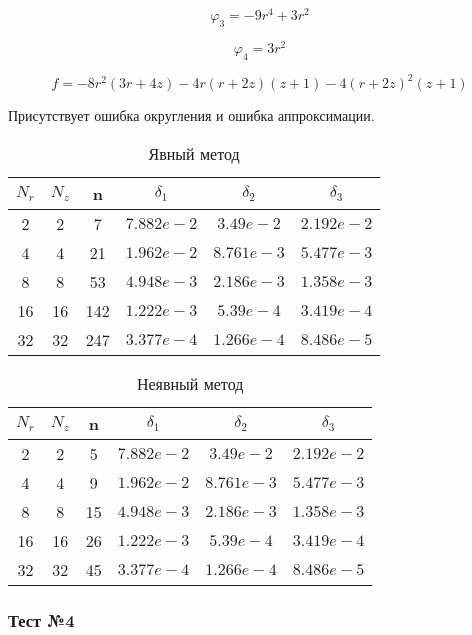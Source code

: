 \[
 \varphi_3 = -9r^4 + 3r^2
\]

\[
 \varphi_4 = 3r^2
\]

\[
  f = - 8 r^{2}\left(3 r + 4 z\right) - 4 r \left(r + 2 z\right) \left(z + 1\right) - 4 \left(r + 2 z\right)^{2} \left(z + 1\right)
\]

Присутствует ошибка округления и ошибка аппроксимации.

\begin{table}[H]
  \begin{center}
    \begin{tabular}{*{6}c}
      \toprule
      $ N_r $ & $ N_z $ & n & $ \delta_1 $ & $ \delta_2 $ & $ \delta_3 $ \\
      \midrule
      2 & 2 & 7 & $7.882e-2 $ & $3.49e-2 $ & $2.192e-2 $ \\
      4 & 4 & 21 & $1.962e-2 $ & $8.761e-3 $ & $5.477e-3 $ \\
      8 & 8 & 53 & $4.948e-3 $ & $2.186e-3 $ & $1.358e-3 $ \\
      16 & 16 & 142 & $1.222e-3 $ & $5.39e-4 $ & $3.419e-4 $ \\
      32 & 32 & 247 & $3.377e-4 $ & $1.266e-4 $ & $8.486e-5 $ \\
      \bottomrule
    \end{tabular}
    \caption{Явный метод}
  \end{center}
\end{table}
  
\begin{table}[H]
  \begin{center}
    \begin{tabular}{*{6}c}
      \toprule
      $ N_r $ & $ N_z $ & n & $ \delta_1 $ & $ \delta_2 $ & $ \delta_3 $ \\
      \midrule
      2 & 2 & 5 & $7.882e-2 $ & $3.49e-2 $ & $2.192e-2 $ \\
      4 & 4 & 9 & $1.962e-2 $ & $8.761e-3 $ & $5.477e-3 $ \\
      8 & 8 & 15 & $4.948e-3 $ & $2.186e-3 $ & $1.358e-3 $ \\
      16 & 16 & 26& $1.222e-3 $ & $5.39e-4 $ & $3.419e-4 $ \\
      32 & 32 & 45 & $3.377e-4 $ & $1.266e-4 $ & $8.486e-5 $ \\
      \bottomrule
    \end{tabular}
    \caption{Неявный метод}
  \end{center}
\end{table}

\subsubsection*{Тест №4}

